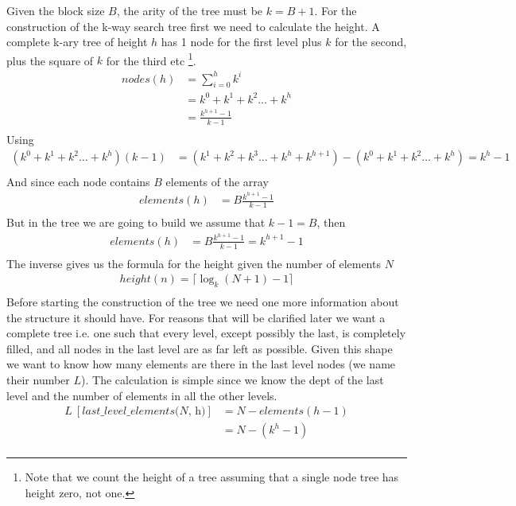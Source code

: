 \documentclass[a4paper]{article}
\newcommand\ceil[1]{\lceil#1\rceil}
\begin{document}
Given the block size $B$, the arity of the tree must be $k = B + 1$.
For the construction of the k-way search tree first we need to calculate the height.
A complete k-ary tree of height $h$ has 1 node for the first level plus $k$ for the second, plus the square of $k$ for the third etc
\footnote{Note that we count the height of a tree assuming that a single node tree has height zero, not one.
}.
\begin{align*}
nodes(h) &= \sum_{i = 0}^{h}{k^i}\\
		  &= k^0 + k^1 + k^2 \dots + k^h\\
		  &= \frac{k^{h + 1} - 1}{k - 1}\\
\end{align*}
Using
\begin{align*}
(k^0 + k^1 + k^2 \dots + k^h)(k - 1) &= (k^1 + k^2 + k^3 \dots + k^h + k^{h+1}) - (k^0 + k^1 + k^2 \dots + k^h) = k^h - 1\\
\end{align*}
And since each node contains $B$ elements of the array
\begin{align*}
elements(h) &= B\frac{k^{h + 1} - 1}{k - 1}\\
\end{align*}
But in the tree we are going to build we assume that $k - 1 = B$, then
\begin{align*}
elements(h) &= B\frac{k^{h + 1} - 1}{k - 1} = k^{h + 1} - 1\\
\end{align*}
The inverse gives us the formula for the height given the number of elements $N$
\begin{align*}
height(n) = \ceil{\log_{k} (N + 1) - 1}\\
\end{align*}
Before starting the construction of the tree we need one more information about the structure it should have.
For reasons that will be clarified later we want a complete tree i.e. one such that every level, except possibly the last, is completely filled, and all nodes in the last level are as far left as possible.
Given this shape we want to know how many elements are there in the last level nodes (we name their number $L$).
The calculation is simple since we know the dept of the last level and the number of elements in all the other levels.
\begin{align*}
L\ [\textit{last\_level\_elements(N, h)}] &= N - elements(h-1)\\
							&= N - (k^{h} - 1)\\
\end{align*}
\end{document}

